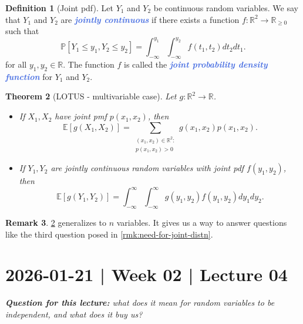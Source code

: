 \documentclass[10pt]{article}
\newtheorem{theorem}{Theorem}
\theoremstyle{definition}
\newtheorem{definition}[theorem]{Definition}
\newtheorem{remark}[theorem]{Remark}
\newcommand{\1}[1]{\textbf{1}_{\left[#1\right]}} %
\def\R{\mathbb{R}} %
\def\E{\mathbb{E}} %
\def\P{\mathbb{P}} %
\newcommand{\demph}[1]{\textcolor{RoyalBlue}{\textbf{\slshape #1}}} %
\begin{document}
\begin{definition}[Joint pdf]
  \label{def:joint-pdf}
  Let $Y_{1}$ and $Y_{2}$ be continuous random variables. We say that $Y_{1}$ and $Y_{2}$
  are \demph{jointly continuous} if there exists a function
  $f:\R^{2} \to \R_{ \geq 0}$ such that 
  \begin{equation*}
    \P\left[Y_{1} \leq y_{1}, Y_{2} \leq  y_{2}\right] =  \int_{-\infty}^{y_{1}}\int_{-\infty}^{y_{2}}    f(t_{1},t_{2}) dt_{2}dt_{1}.
  \end{equation*}
  for all $y_{1},y_{2}\in \R$. The function $f$ is called the \demph{joint probability
  density function} for $Y_{1}$ and $Y_{2}$.
\end{definition}


\begin{theorem}[LOTUS - multivariable case]
  \label{thm:lotus-multivariable-case}
  Let $g:\R^{2}\to \R$.
  \begin{itemize}
    \item   If $X_{1},X_{2}$ have joint pmf $p(x_{1},x_{2})$, then
    \begin{equation*}
      \E\left[g(X_{1},X_{2}) \right] = \sum_{\substack{(x_{1},x_{2})\in \R^{2}:\\ p(x_{1},x_{2})>0}} g(x_{1},x_{2})p(x_{1},x_{2}).
    \end{equation*}
    \item If $Y_{1},Y_{2}$ are jointly continuous random variables with joint
    pdf $f(y_{1},y_{2})$, then
    \begin{equation*}
      \E\left[g(Y_{1},Y_{2}) \right] = \int_{-\infty}^{\infty}\int_{-\infty}^{\infty}g(y_{1},y_{2})f(y_{1},y_{2})dy_{1}dy_{2}.  
    \end{equation*}
  \end{itemize}
\end{theorem}

\begin{remark}
  \cref{thm:lotus-multivariable-case} generalizes to $n$ variables. It gives
  us a way to answer questions like the third question posed in
  \cref{rmk:need-for-joint-distn}.
\end{remark}

\newpage
\section{2026-01-21 | Week 02 | Lecture 04}

\begin{center}
  \begin{tcolorbox}[width=0.9\textwidth, colback=white, colframe=black]
    \textit{\textbf{Question for this lecture:} what does it mean for random
      variables to be independent, and what does it buy us?}
  \end{tcolorbox}
\end{center}
\end{document}
